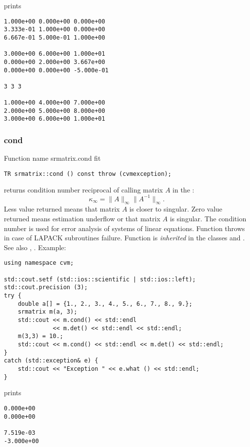 prints
\begin{Verbatim}
1.000e+00 0.000e+00 0.000e+00
3.333e-01 1.000e+00 0.000e+00
6.667e-01 5.000e-01 1.000e+00

3.000e+00 6.000e+00 1.000e+01
0.000e+00 2.000e+00 3.667e+00
0.000e+00 0.000e+00 -5.000e-01

3 3 3

1.000e+00 4.000e+00 7.000e+00
2.000e+00 5.000e+00 8.000e+00
3.000e+00 6.000e+00 1.000e+01
\end{Verbatim}
\newpage





\subsubsection{cond}
Function%
\pdfdest name {srmatrix.cond} fit
\begin{verbatim}
TR srmatrix::cond () const throw (cvmexception);
\end{verbatim}
returns  condition number reciprocal of 
calling matrix $A$ in the :
\begin{equation*}
\kappa_\infty=\|A\|_\infty \|A^{-1}\|_\infty.
\end{equation*}
Less value returned means that matrix $A$ is closer to singular.
Zero value returned means estimation underflow or
that matrix $A$ is singular.
The condition number is used for error analysis
of systems of linear equations.
Function throws  in case of LAPACK
subroutines failure.
Function is \emph{inherited} in the classes
and .
See also
, .
Example:
\begin{Verbatim}
using namespace cvm;

std::cout.setf (std::ios::scientific | std::ios::left); 
std::cout.precision (3);
try {
    double a[] = {1., 2., 3., 4., 5., 6., 7., 8., 9.};
    srmatrix m(a, 3);
    std::cout << m.cond() << std::endl 
              << m.det() << std::endl << std::endl;
    m(3,3) = 10.;
    std::cout << m.cond() << std::endl << m.det() << std::endl;
}
catch (std::exception& e) {
    std::cout << "Exception " << e.what () << std::endl;
}
\end{Verbatim}
prints
\begin{Verbatim}
0.000e+00
0.000e+00

7.519e-03
-3.000e+00
\end{Verbatim}
\newpage



